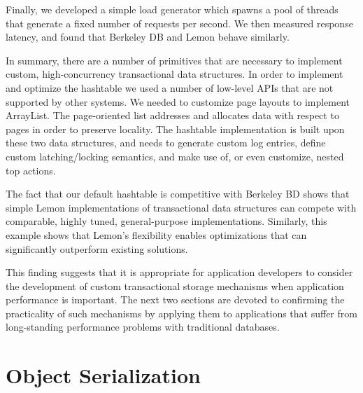 \documentclass[10pt,letterpaper,twocolumn,english]{article}
\newcommand{\yad}{Lemon\xspace}
\begin{document}
Finally, we developed a simple load generator which spawns a pool of threads that
generate a fixed number of requests per second.  We then measured
response latency, and found that Berkeley DB and \yad behave
similarly.

In summary, there are a number of primitives that are necessary to
implement custom, high-concurrency transactional data structures.  In
order to implement and optimize the hashtable we used a number of
low-level APIs that are not supported by other systems.  We needed to
customize page layouts to implement ArrayList.  The page-oriented list
addresses and allocates data with respect to pages in order to
preserve locality.  The hashtable implementation is built upon these
two data structures, and needs to generate custom log
entries, define custom latching/locking semantics, and make use of, or
even customize, nested top actions.

The fact that our default hashtable is competitive with Berkeley BD
shows that simple \yad implementations of transactional data structures
can compete with comparable, highly tuned, general-purpose
implementations.  Similarly, this example shows that \yad's flexibility enables optimizations that can significantly
outperform existing solutions.

This finding suggests that it is appropriate for
application developers to consider the development of custom
transactional storage mechanisms when application performance is
important.  The next two sections are devoted to confirming the 
practicality of such mechanisms by applying them to applications 
that suffer from long-standing performance problems with traditional databases.






\section{Object Serialization}
\label{OASYS}
\end{document}
